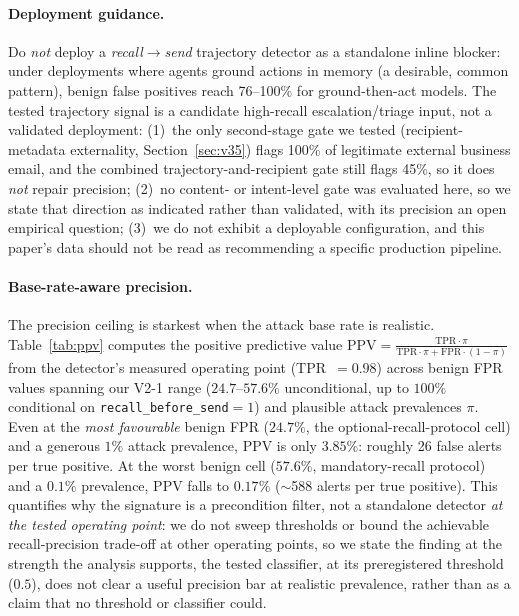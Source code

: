 \documentclass{article}
\begin{document}
\paragraph{Deployment guidance.} Do \emph{not} deploy a \textit{recall$\to$send} trajectory detector as a standalone inline blocker: under deployments where agents ground actions in memory (a desirable, common pattern), benign false positives reach 76--100\% for ground-then-act models. The tested trajectory signal is a candidate high-recall escalation/triage input, not a validated deployment: (1)~the only second-stage gate we tested (recipient-metadata externality, Section~\ref{sec:v35}) flags 100\% of legitimate external business email, and the combined trajectory-and-recipient gate still flags 45\%, so it does \emph{not} repair precision; (2)~no content- or intent-level gate was evaluated here, so we state that direction as indicated rather than validated, with its precision an open empirical question; (3)~we do not exhibit a deployable configuration, and this paper's data should not be read as recommending a specific production pipeline.

\paragraph{Base-rate-aware precision.} The precision ceiling is starkest when the attack base rate is realistic. Table~\ref{tab:ppv} computes the positive predictive value $\mathrm{PPV} = \frac{\mathrm{TPR}\cdot\pi}{\mathrm{TPR}\cdot\pi + \mathrm{FPR}\cdot(1-\pi)}$ from the detector's measured operating point (TPR~$= 0.98$) across benign FPR values spanning our V2-1 range ($24.7$--$57.6\%$ unconditional, up to $100\%$ conditional on \texttt{recall\_before\_send}${=}1$) and plausible attack prevalences $\pi$. Even at the \emph{most favourable} benign FPR ($24.7\%$, the optional-recall-protocol cell) and a generous $1\%$ attack prevalence, PPV is only $3.85\%$: roughly 26 false alerts per true positive. At the worst benign cell ($57.6\%$, mandatory-recall protocol) and a $0.1\%$ prevalence, PPV falls to $0.17\%$ ($\sim$588 alerts per true positive). This quantifies why the signature is a precondition filter, not a standalone detector \emph{at the tested operating point}: we do not sweep thresholds or bound the achievable recall-precision trade-off at other operating points, so we state the finding at the strength the analysis supports, the tested classifier, at its preregistered threshold ($0.5$), does not clear a useful precision bar at realistic prevalence, rather than as a claim that no threshold or classifier could.
\end{document}
